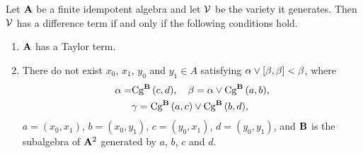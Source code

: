 \begin{theorem}
Let $\mathbf{A}$ be a finite idempotent algebra and let $\mathcal{V}$ be the variety 
it generates. Then $\mathcal{V}$ has a difference term if and only if the
following conditions hold.
\begin{enumerate}
\item $\mathbf{A}$ has a Taylor term.
\item There do not exist $x_0$, $x_1$, $y_0$ and $y_1\in A$
satisfying $\alpha \join [\beta,\beta] < \beta$,
where 
\begin{align*}
\alpha = &\Cga c d B, \quad \beta = \alpha \join \Cga a b B,\\
&\gamma = \Cga a c B \join \Cga b d B,
\end{align*}
$a = (x_0,x_1)$, $b = (x_0,y_1)$, $c = (y_0,x_1)$,
$d=(y_0,y_1)$, and $\mathbf{B}$ is the subalgebra of $\mathbf{A}^2$ generated
by $a$, $b$, $c$ and $d$.
\end{enumerate}
\end{theorem}


